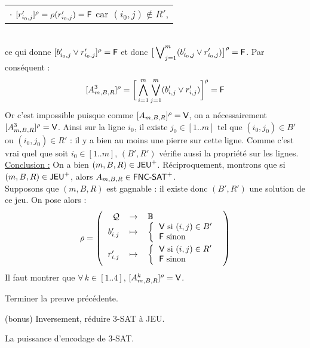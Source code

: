 \begin{Preuve}
\begin{tabular}[t]{l}
					\(\cdot\) \([r'_{i_0,j}]^{\rho} = \rho(r'_{i_0,j}) = \text{\sf{F}} \) car \((i_0,j) \notin R'\), \end{tabular} \eqskip{2mm}\\[1mm]
				ce qui donne \([b'_{i_0,j} \vee r'_{i_0,j}]^{\rho} = \text{\sf{F}}\) et donc \(\displaystyle \big[\bigvee\nolimits_{j=1}^m (b'_{i_0,j} \vee r'_{i_0,j})\big]^\rho = \text{\sf{F}}\). Par conséquent :
					\[
						[A^{3}_{m,B,R}]^{\rho} = \bigg[\bigwedge_{i=1}^m \bigvee_{j=1}^m (b'_{i,j} \vee r'_{i,j})\bigg]^\rho = \text{\sf{F}}
					\]
				Or c'est impossible puisque comme \([A_{m,B,R}]^{\rho} = \text{\sf{V}}\), on a nécessairement \([A^{3}_{m,B,R}]^{\rho} = \text{\sf{V}}\). \nt
				Ainsi sur la ligne \(i_0\), il existe \(j_0\in[1..m]\) tel que \((i_0,j_0) \in B'\) ou \((i_0,j_0) \in R'\) : il y a bien au moins une pierre sur cette ligne. Comme c'est vrai quel que soit \(i_0\in[1..m]\), \((B',R')\) vérifie aussi la propriété sur les lignes. \\[3mm]
				\underline{Conclusion :} On a bien \((m,B,R) \in\text{\textsf{JEU}}^+\). \nll
				\impleft Réciproquement, montrons que si \((m,B,R)\in\text{\textsf{JEU}}^+\), alors \(A_{m,B,R} \in \text{\textsf{FNC-SAT}}^+\). \\
				Supposons que \((m,B,R)\) est gagnable : il existe donc \((B',R')\) une solution de ce jeu. On pose alors :
					\[
						\rho = \funn{\cal{Q}}{\bb{B}}{b'_{i,j}}{
							\left\{ \begin{tabular}[h]{l}
								\(\V\) si \((i,j)\in B'\) \\
								\(\F\) sinon
							\end{tabular} \right. \vs{1}
						}{r'_{i,j}}{
							\left\{ \begin{tabular}[h]{l}
							\(\V\) si \((i,j)\in R'\) \\
							\(\F\) sinon
						\end{tabular} \right.
						}
					\]
				Il faut montrer que \(\forall\,k\in[1..4]\), \([A_{m,B,R}^k]^{\rho} = \text{\sf{V}}\).
			\end{Preuve}
			
			\begin{Exercice}
				Terminer la preuve précédente.
			\end{Exercice}
			
			\begin{Exercice}
				(bonus) Inversement, réduire \textsf{3-SAT} à \textsf{JEU}.
			\end{Exercice}
			
			\begin{Aretenir}
				La puissance d'encodage de \textsf{3-SAT}.
			\end{Aretenir}

